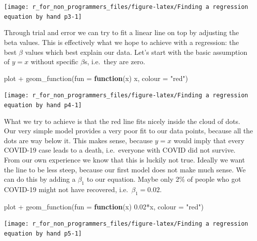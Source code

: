 \documentclass[
]{book}
\newenvironment{Shaded}{\begin{snugshade}}{\end{snugshade}}
\newcommand{\AttributeTok}[1]{\textcolor[rgb]{0.77,0.63,0.00}{#1}}
\newcommand{\ControlFlowTok}[1]{\textcolor[rgb]{0.13,0.29,0.53}{\textbf{#1}}}
\newcommand{\FloatTok}[1]{\textcolor[rgb]{0.00,0.00,0.81}{#1}}
\newcommand{\FunctionTok}[1]{\textcolor[rgb]{0.00,0.00,0.00}{#1}}
\newcommand{\NormalTok}[1]{#1}
\newcommand{\SpecialCharTok}[1]{\textcolor[rgb]{0.00,0.00,0.00}{#1}}
\newcommand{\StringTok}[1]{\textcolor[rgb]{0.31,0.60,0.02}{#1}}
\begin{document}
\begin{center}\texttt{[image: r\_for\_non\_programmers\_files/figure-latex/Finding a regression equation by hand p3-1]} \end{center}

Through trial and error we can try to fit a linear line on top by adjusting the beta values. This is effectively what we hope to achieve with a regression: the best \(\beta\) values which best explain our data. Let's start with the basic assumption of \(y = x\) without specific \(\beta\)s, i.e.~they are zero.

\begin{Shaded}
\begin{Highlighting}[]
\NormalTok{plot }\SpecialCharTok{+}
  \FunctionTok{geom\_function}\NormalTok{(}\AttributeTok{fun =} \ControlFlowTok{function}\NormalTok{(x) x, }\AttributeTok{colour =} \StringTok{"red"}\NormalTok{)}
\end{Highlighting}
\end{Shaded}

\begin{center}\texttt{[image: r\_for\_non\_programmers\_files/figure-latex/Finding a regression equation by hand p4-1]} \end{center}

What we try to achieve is that the red line fits nicely inside the cloud of dots. Our very simple model provides a very poor fit to our data points, because all the dots are way below it. This makes sense, because \(y = x\) would imply that every COVID-19 case leads to a death, i.e.~everyone with COVID did not survive. From our own experience we know that this is luckily not true. Ideally we want the line to be less steep, because our first model does not make much sense. We can do this by adding a \(\beta_1\) to our equation. Maybe only 2\% of people who got COVID-19 might not have recovered, i.e.~\(\beta_1 = 0.02\).

\begin{Shaded}
\begin{Highlighting}[]
\NormalTok{plot }\SpecialCharTok{+}
  \FunctionTok{geom\_function}\NormalTok{(}\AttributeTok{fun =} \ControlFlowTok{function}\NormalTok{(x) }\FloatTok{0.02}\SpecialCharTok{*}\NormalTok{x, }\AttributeTok{colour =} \StringTok{"red"}\NormalTok{)}
\end{Highlighting}
\end{Shaded}

\begin{center}\texttt{[image: r\_for\_non\_programmers\_files/figure-latex/Finding a regression equation by hand p5-1]} \end{center}
\end{document}
